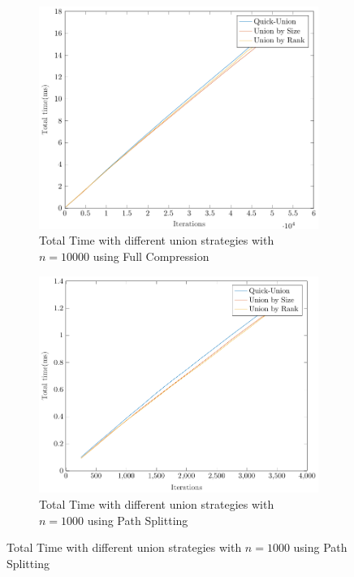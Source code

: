 \begin{figure}[ht]
\begin{subfigure}{0.32\textwidth}
    \end{subfigure}%
    \hfill
    \begin{subfigure}{0.32\textwidth}
        \centering
        \includegraphics[width=\textwidth]{../images/plotFCFull10000_time(ms).pdf}
        \caption{Total Time with different union strategies with $n = 10000$ using Full Compression}
    \end{subfigure}
    \begin{subfigure}{0.32\textwidth}
        \centering
        \includegraphics[width=\textwidth]{../images/plotPSFull1000_time(ms).pdf}
        \caption{Total Time with different union strategies with $n = 1000$ using Path Splitting}

\end{subfigure}
\end{figure}
